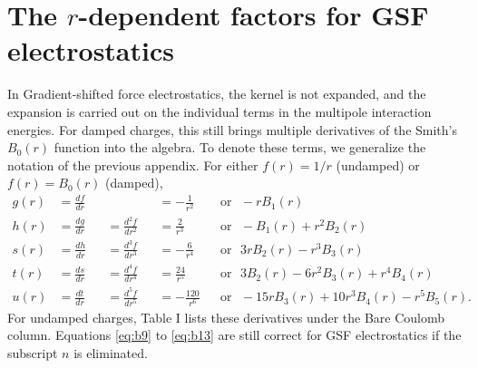 \section{The $r$-dependent factors for GSF electrostatics}
\label{radialGSF}

In Gradient-shifted force electrostatics, the kernel is not expanded,
and the expansion is carried out on the individual terms in the
multipole interaction energies. For damped charges, this still brings
multiple derivatives of the Smith's $B_0(r)$ function into the
algebra. To denote these terms, we generalize the notation of the
previous appendix. For either $f(r)=1/r$ (undamped) or $f(r)=B_0(r)$
(damped),
%
\begin{align}
g(r) &= \frac{df}{d r} &&                      &&=-\frac{1}{r^2}
&&\mathrm{or~~~} -rB_1(r) \\
h(r) &= \frac{dg}{d r} &&= \frac{d^2f}{d r^2} &&= \frac{2}{r^3} &&\mathrm{or~~~}-B_1(r) + r^2 B_2(r) \\
s(r) &= \frac{dh}{d r} &&= \frac{d^3f}{d r^3} &&=-\frac{6}{r^4}&&\mathrm{or~~~}3rB_2(r) - r^3 B_3(r)\\
t(r) &= \frac{ds}{d r} &&= \frac{d^4f}{d r^4} &&= \frac{24}{r^5} &&\mathrm{or~~~} 3
B_2(r) - 6r^2 B_3(r) + r^4 B_4(r) \\
u(r) &= \frac{dt}{d r} &&= \frac{d^5f}{d r^5} &&=-\frac{120}{r^6} &&\mathrm{or~~~} -15
r B_3(r) + 10 r^3B_4(r) -r^5B_5(r).
\end{align}
%
For undamped charges, Table I lists these derivatives under the Bare
Coulomb column. Equations \ref{eq:b9} to \ref{eq:b13} are still
correct for GSF electrostatics if the subscript $n$ is eliminated.

%
% 
% 